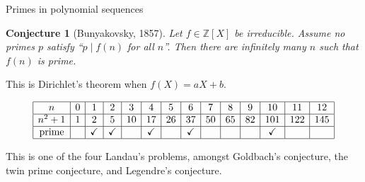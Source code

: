 \documentclass[10pt]{beamer}
\newtheorem{conjecture}{Conjecture}
\begin{document}
\begin{frame}[t]{Primes in polynomial sequences}

\begin{conjecture}[Bunyakovsky, 1857]
Let $ f \in \mathbb{Z}[X] $ be irreducible. Assume no primes $ p $ satisfy ``$ p \mid f(n) $ for all $ n $''. Then there are infinitely many $ n $ such that $ f(n) $ is prime.
\end{conjecture}

\pause

\vspace{0.5cm} This is Dirichlet's theorem when $ f(X) = aX + b $.

\pause

\vspace{0.5cm}

\begin{example}[$ X^2 + 1 $]
\vspace{-0.5cm}
$$
\begin{array}{|c|c|c|c|c|c|c|c|c|c|c|c|c|c|}
\hline
n & 0 & 1 & 2 & 3 & 4 & 5 & 6 & 7 & 8 & 9 & 10 & 11 & 12 \\
\hline
n^2 + 1 & 1 & 2 & 5 & 10 & 17 & 26 & 37 & 50 & 65 & 82 & 101 & 122 & 145 \\
\hline
\text{prime} & & \checkmark & \checkmark & & \checkmark & & \checkmark & & & & \checkmark & & \\
\hline
\end{array}
$$

\pause

This is one of the four Landau's problems, amongst Goldbach's conjecture, the twin prime conjecture, and Legendre's conjecture.
\end{example}

\end{frame}
\end{document}
